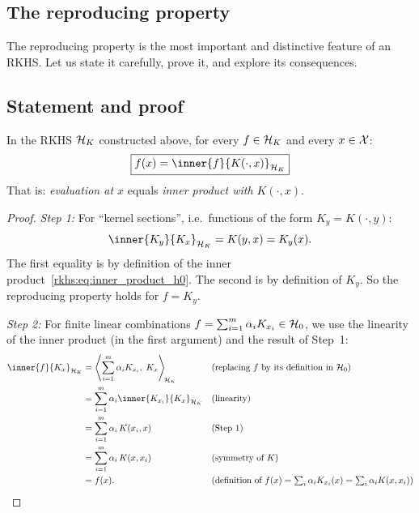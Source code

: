 \begin{notechapter}
\section{The reproducing property}
\label{rkhs:sec:reproducing_property}

The reproducing property is the most important and distinctive feature
of an RKHS. Let us state it carefully, prove it, and explore its
consequences.

\subsection{Statement and proof}

\begin{proposition}
\label{rkhs:prop:reproducing}
In the RKHS $\mathcal{H}_K$ constructed above, for every $f \in \mathcal{H}_K$ and every $x \in \mathcal{X}$:
\begin{equation}
\label{rkhs:eq:reproducing}
\boxed{f(x) = \inner{f}{K(\cdot, x)}_{\hk}}
\end{equation}
That is: \emph{evaluation at $x$} equals \emph{inner product with
$K(\cdot, x)$}.
\end{proposition}

\begin{proof}
\emph{Step 1:} For ``kernel sections'', i.e.\ functions of the form
$K_y = K(\cdot, y)$:
\[
\inner{K_y}{K_x}_{\hk} = K(y, x) = K_y(x).
\]
The first equality is by definition of the inner
product~\eqref{rkhs:eq:inner_product_h0}. The second is by definition of
$K_y$. So the reproducing property holds for $f = K_y$.

\emph{Step 2:} For finite linear combinations
$f = \sum_{i=1}^m \alpha_i K_{x_i} \in \mathcal{H}_0$, we
use the linearity of the inner product (in the first
argument) and the result of Step~1:
\begin{align*}
\inner{f}{K_x}_{\hk}
&= \left\langle \sum_{i=1}^m \alpha_i K_{x_i},\;
   K_x \right\rangle_{\!\hk}
   && \text{(replacing $f$ by its definition
   in $\hilb_0$)} \\
&= \sum_{i=1}^m \alpha_i
   \inner{K_{x_i}}{K_x}_{\hk}
   && \text{(linearity)} \\
&= \sum_{i=1}^m \alpha_i\, K(x_i, x)
   && \text{(Step 1)} \\
&= \sum_{i=1}^m \alpha_i\, K(x, x_i)
   && \text{(symmetry of $K$)} \\
&= f(x).
   && \text{(definition of
   $f(x) = \textstyle\sum_i \alpha_i K_{x_i}(x)
   = \textstyle\sum_i \alpha_i K(x, x_i)$)}
\end{align*}


\end{proof}
\end{notechapter}
